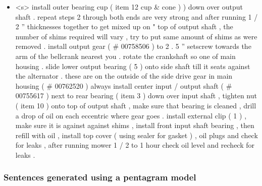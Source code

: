 \begin{itemize}
	\item <s> install outer bearing cup ( item 12 cup \& cone ) ) down over output shaft . repeat steps 2 through both ends are very strong and after running 1 / 2 ” thicknesses together to get mixed up on " top of output shaft , the number of shims required will vary , try to put same amount of shims as were removed . install output gear ( \# 00758506 ) to 2 . 5 ” setscrew towards the arm of the bellcrank nearest you . rotate the crankshaft so one of main housing . slide lower output bearing ( 5 ) onto side shaft till it seats against the alternator . these are on the outside of the side drive gear in main housing ( \# 00762520 ) always install center input / output shaft ( \# 00755617 ) next to rear bearing ( item 3 ) down over input shaft , tighten nut ( item 10 ) onto top of output shaft , make sure that bearing is cleaned , drill a drop of oil on each eccentric where gear goes . install external clip ( 1 ) , make sure it is against against shims , install front input shaft bearing , then refill with oil , install top cover ( using sealer for gasket ) , oil plugs and check for leaks , after running mower 1 / 2 to 1 hour check oil level and recheck for leaks .
\end{itemize}



\subsubsection{Sentences generated using a pentagram model}

